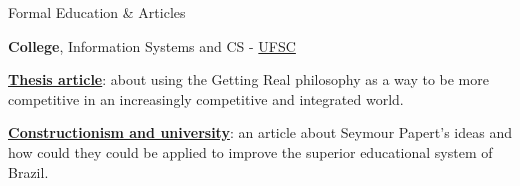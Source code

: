 \begin{rubric}{Formal Education \& Articles}

    \entry*[2002 -- 2007] \textbf{College}, Information Systems and CS -
    \href{http://www.ufsc.br}{UFSC}

    \entry*
    \textbf{\href{http://www.cnxs.com.br/posts/my-thesis-short-article}{Thesis
    article}}: about using the Getting Real philosophy as
    a way to be more competitive in an increasingly competitive and integrated
    world. 

    \entry*
    \textbf{\href{http://www.cnxs.com.br/learning_curve.pdf}{Constructionism
    and university}}: an article about Seymour Papert's ideas and how could they
    could be applied to improve the superior educational system of Brazil. 

\end{rubric}
